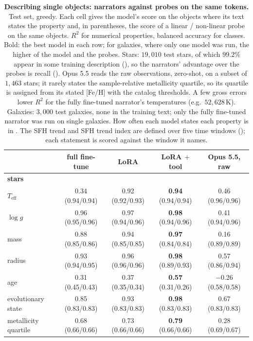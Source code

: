 \begin{table}[t]\centering\small
\caption{\textbf{Describing single objects: narrators against probes on the same tokens.}
Test set, greedy. Each cell gives the model's score on the objects where its text states the
property and, in parentheses, the score of a linear / non-linear probe on the same objects.
$R^2$ for numerical properties, balanced accuracy for classes. Bold: the best model in each row; for galaxies, where only one model was run, the higher of the model and the probes. Stars: $19{,}010$ test stars, of which $99.2\%$ appear in some training description
(), so the narrators' advantage over the probes is recall
(). Opus 5.5 reads the raw observations, zero-shot, on a subset of
$1{,}463$ stars; it rarely states the sample-relative metallicity quartile, so its quartile is
assigned from its stated [Fe/H] with the catalog thresholds. A few gross errors lower $R^2$ for the fully fine-tuned narrator's
temperatures (e.g.\ $52{,}628$\,K). Galaxies: $3{,}000$ test galaxies, none in the training
text; only the fully fine-tuned narrator was run on single galaxies. How often each model
states each property is in . The SFH trend
and SFH trend index are defined over five time windows (); each statement
is scored against the window it names.}
\label{tab:single}
\begin{tabular}{lcccc}
\toprule
 & full fine-tune & LoRA & LoRA $+$ tool & Opus 5.5, raw \\
\midrule
\multicolumn{5}{l}{\textbf{stars}}\\
$T_\mathrm{eff}$ & 0.34 (0.94/0.94) & 0.92 (0.92/0.93) & \textbf{0.94} (0.94/0.94) & 0.46 (0.96/0.96) \\
$\log g$ & 0.96 (0.95/0.96) & 0.97 (0.94/0.96) & \textbf{0.98} (0.94/0.96) & 0.41 (0.94/0.96) \\
mass & 0.88 (0.85/0.86) & 0.94 (0.85/0.85) & \textbf{0.97} (0.84/0.84) & 0.16 (0.89/0.89) \\
radius & 0.93 (0.94/0.95) & 0.96 (0.96/0.96) & \textbf{0.98} (0.89/0.93) & 0.57 (0.86/0.94) \\
age & 0.31 (0.45/0.43) & 0.37 (0.35/0.34) & \textbf{0.57} (0.31/0.26) & $-$0.26 (0.58/0.58) \\
evolutionary state & 0.85 (0.83/0.83) & 0.93 (0.83/0.83) & \textbf{0.98} (0.83/0.83) & 0.67 (0.83/0.83) \\
metallicity quartile & 0.68 (0.66/0.66) & 0.73 (0.66/0.66) & \textbf{0.79} (0.66/0.66) & 0.28 (0.69/0.67) \\

\end{tabular}
\end{table}
